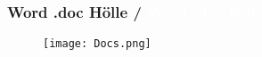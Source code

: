 \documentclass[13pt]{beamer}
\begin{document}
{
\begin{frame}
  \frametitle{Word\textsuperscript{\tiny\textregistered} .doc Hölle /
    \textcolor{white}{Word\textsuperscript{\tiny\textregistered} .doc hell}}
  \begin{figure}
  \texttt{[image: Docs.png]}
  \end{figure}
\end{frame}
}
\end{document}
